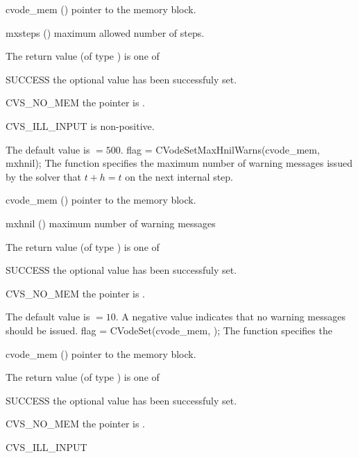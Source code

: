 {
  \begin{args}
  \item[cvode\_mem] ()
    pointer to the {\cvodes} memory block.
  \item[mxsteps] ()
    maximum allowed number of steps.
  \end{args}
}
{
  The return value  (of type ) is one of
  \begin{args}
  \item[SUCCESS] 
    the optional value has been successfuly set.
  \item[CVS\_NO\_MEM]
    the  pointer is .
  \item[CVS\_ILL\_INPUT]
     is non-positive.
  \end{args}
}
{
  The default value is $= 500$.
}
{
flag = CVodeSetMaxHnilWarns(cvode\_mem, mxhnil);
}
{
  The function  specifies the maximum number of warning messages
  issued by the solver that $t+h=t$ on the next internal step.
}
{
  \begin{args}
  \item[cvode\_mem] ()
    pointer to the {\cvodes} memory block.
  \item[mxhnil] ()
    maximum number of warning messages
  \end{args}
}
{
  The return value  (of type ) is one of
  \begin{args}
  \item[SUCCESS] 
    the optional value has been successfuly set.
  \item[CVS\_NO\_MEM]
    the  pointer is .
  \end{args}
}
{
  The default value is $= 10$.
  A negative  value indicates that no warning messages should
  be issued.
}
{
flag = CVodeSet(cvode\_mem, );
}
{
  The function  specifies the
}
{
  \begin{args}
  \item[cvode\_mem] ()
    pointer to the {\cvodes} memory block.
  \item[]
    
  \end{args}
}
{
  The return value  (of type ) is one of
  \begin{args}
  \item[SUCCESS] 
    the optional value has been successfuly set.
  \item[CVS\_NO\_MEM]
    the  pointer is .
  \item[CVS\_ILL\_INPUT]
    
  \end{args}
}
